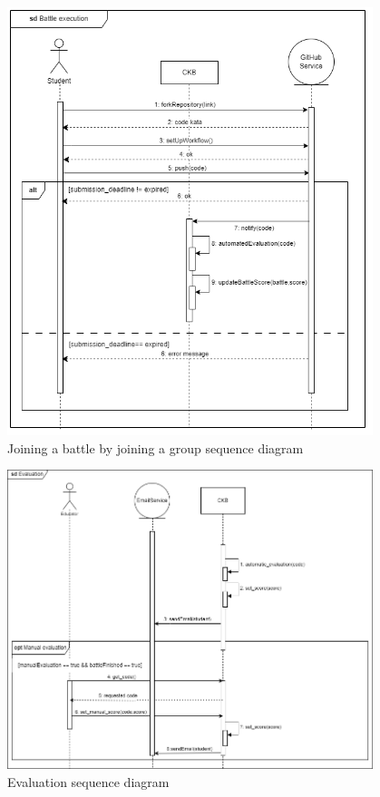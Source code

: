 \begin{figure}[H]
    \centering
    \includegraphics[width=0.95\textwidth]{images/seq_diagrams/battle_execution.png}
    \caption{Joining a battle by joining a group sequence diagram}
\end{figure}
\clearpage

\begin{figure}[H]
    \centering
    \includegraphics[width=0.95\textwidth]{images/seq_diagrams/Evaluation.png}
    \caption{Evaluation sequence diagram}
\end{figure}
\clearpage

